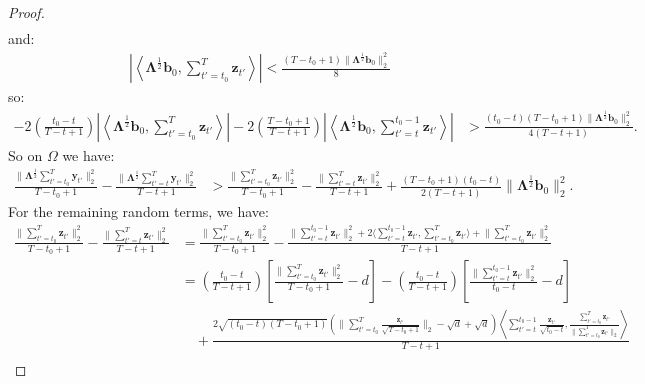 \begin{proof}
\begin{align*}
\end{align*}
and:
\begin{align*}
    \left|\left\langle\boldsymbol{\Lambda}^{\frac{1}{2}}\mathbf{b}_0, \sum_{t'=t_0}^T \mathbf{z}_{t'} \right\rangle\right| < \frac{(T-t_0+1) \lVert\boldsymbol{\Lambda}^{\frac{1}{2}} \mathbf{b}_0\rVert_2^2}{8} \tag{on $\Omega_1 \subseteq \Omega_2$}
\end{align*}
so:
\begin{align*}
    - 2\left(\frac{t_0 - t}{T-t+1}\right)\left|\left\langle \boldsymbol{\Lambda}^{\frac{1}{2}}\mathbf{b}_0, \sum_{t'=t_0}^T\mathbf{z}_{t'}\right\rangle\right| - 2\left(\frac{T-t_0+1}{T-t+1}\right)\left|\left\langle \boldsymbol{\Lambda}^{\frac{1}{2}}\mathbf{b}_0, \sum_{t'=t}^{t_0-1}\mathbf{z}_{t'}\right\rangle\right| 
    &> \frac{(t_0-t)(T-t_0+1)\lVert\boldsymbol{\Lambda}^{\frac{1}{2}} \mathbf{b}_0\rVert_2^2}{4(T-t+1)}.
\end{align*}
So on $\Omega$ we have:
\begin{align*}
    \frac{\lVert\boldsymbol{\Lambda}^{\frac{1}{2}} \sum_{t'=t_0}^T\mathbf{y}_{t'}\rVert_2^2}{T-t_0+1} - \frac{\lVert\boldsymbol{\Lambda}^{\frac{1}{2}} \sum_{t'=t}^T\mathbf{y}_{t'}\rVert_2^2}{T-t+1} &> \frac{\lVert \sum_{t'=t_0}^T\mathbf{z}_{t'}\rVert_2^2}{T-t_0+1} - \frac{\lVert\sum_{t'=t}^T\mathbf{z}_{t'}\rVert_2^2}{T-t+1} + \frac{(T-t_0+1)(t_0 - t) }{2(T-t+1)}\lVert\boldsymbol{\Lambda}^{\frac{1}{2}} \mathbf{b}_0\rVert^2_2 .
\end{align*}
For the remaining random terms, we have:
\small
\begin{align*}
    \frac{\lVert\sum_{t'=t_0}^T\mathbf{z}_{t'}\rVert_2^2}{T-t_0+1} - \frac{\lVert\sum_{t'=t}^T\mathbf{z}_{t'}\rVert_2^2}{T-t+1} &= \frac{\lVert\sum_{t'=t_0}^T\mathbf{z}_{t'}\rVert_2^2}{T-t_0+1} - 
    \frac{\lVert\sum_{t'=t}^{t_0-1}\mathbf{z}_{t'}\rVert_2^2 + 2\langle \sum_{t'=t}^{t_0-1}\mathbf{z}_{t'}, \sum_{t'=t_0}^{T}\mathbf{z}_{t'}\rangle + \lVert\sum_{t'=t_0}^{T}\mathbf{z}_{t'}\rVert_2^2}{T-t+1} \\
    &= \left(\frac{t_0-t}{T-t+1}\right)\left[\frac{\lVert\sum_{t'=t_0}^T\mathbf{z}_{t'}\rVert_2^2}{T-t_0 + 1} - d\right] - \left(\frac{t_0-t}{T-t+1}\right)\left[\frac{\lVert\sum_{t'=t}^{t_0-1}\mathbf{z}_{t'}\rVert_2^2}{t_0-t} -d \right] \\
    &\quad +\frac{2\sqrt{(t_0-t)(T-t_0+1)}\left(\lVert\sum_{t'=t_0}^{T}\frac{\mathbf{z}_{t'}}{\sqrt{T-t_0+1}}\rVert_2 -\sqrt{d} + \sqrt{d}\right)\left\langle \sum_{t'=t}^{t_0-1}\frac{\mathbf{z}_{t'}}{\sqrt{t_0-t}}, \frac{\sum_{t'=t_0}^{T}\mathbf{z}_{t'}}{\lVert\sum_{t'=t_0}^{T}\mathbf{z}_{t'}\rVert_2}\right\rangle}{T-t+1} \\

\end{align*}
\end{proof}
